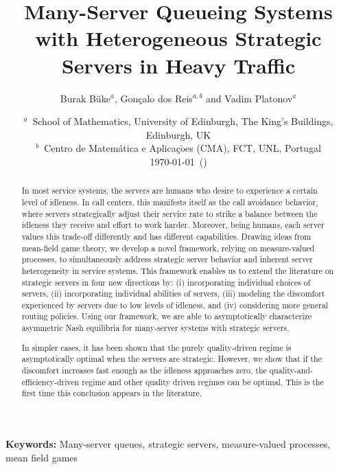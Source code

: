 \documentclass[a4paper,11pt,twoside]{article}
\title{Many-Server Queueing Systems with Heterogeneous Strategic Servers in Heavy Traffic}
\author{Burak B\"{u}ke\textit{$^{a}$}, Gon\c calo dos Reis\textit{$^{a,b}$} and Vadim Platonov\textit{$^{a}$}}
\date{%
    \footnotesize 
    $^{a}$~School of Mathematics, University of Edinburgh, The King's Buildings, Edinburgh, UK
    \\
    $^{b}$~Centro de Matem\'atica e Aplica\c c$\tilde{\text{o}}$es (CMA), FCT, UNL, Portugal
    \\[2ex]
    \longdate \today \ (\currenttime)
}
\numberwithin{equation}{section}
\numberwithin{figure}{section}
\renewcommand*{\thefootnote}{\fnsymbol{footnote}}
\theoremstyle{plain}
\newcommand{\1}{\mathbbm{1}}
\begin{document}

\maketitle
\renewcommand*{\thefootnote}{\arabic{footnote}}

\vspace{-1cm}
\begin{abstract} 
In most service systems, the servers are humans who desire to experience a certain level of idleness. In call centers, this manifests itself as the call avoidance behavior, where servers strategically adjust their service rate to strike a balance between the idleness they receive and effort to work harder. Moreover, being humans, each server values this trade-off differently and has different capabilities. Drawing ideas from mean-field game theory, we develop a novel framework, relying on measure-valued processes,  to simultaneously address strategic server behavior and inherent server heterogeneity in service systems. 
This framework enables us to extend the literature on strategic servers in four new directions by: (i) incorporating individual choices of servers, (ii) incorporating individual abilities of servers, (iii) modeling the discomfort experienced by servers due to low levels of idleness, and (iv) considering more general routing policies. Using our framework, we are able to asymptotically characterize asymmetric Nash equilibria for many-server systems with strategic servers. 

In simpler cases, it has been shown that the purely quality-driven regime is asymptotically optimal when the servers are strategic. However, we show that if the discomfort increases fast enough as the idleness approaches zero, the quality-and-efficiency-driven regime and other quality driven regimes can be optimal. This is the first time this conclusion appears in the literature. 
\end{abstract}
{\bf Keywords:} 
Many-server queues, strategic servers, measure-valued processes, mean field games
\end{document}
